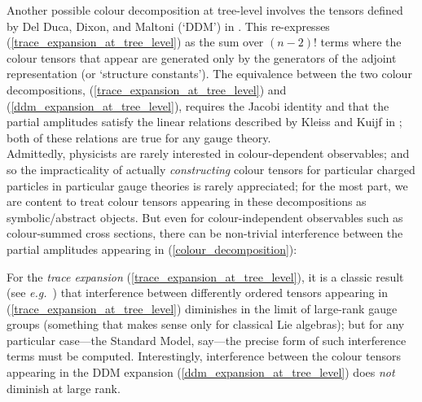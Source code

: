 \documentclass[12pt,a4paper]{article}\let\ifpdf\relax
\begin{document}
Another possible colour decomposition at tree-level involves the tensors defined by Del Duca, Dixon, and Maltoni (`DDM') in \cite{DelDuca:1999rs}. This re-expresses (\ref{trace_expansion_at_tree_level}) as the sum over $(n{-}2)!$ terms
%
\vspace{-0pt}
%
where the colour tensors that appear are generated only by the generators of the adjoint representation (or `structure constants'). The equivalence between the two colour decompositions, (\ref{trace_expansion_at_tree_level}) and (\ref{ddm_expansion_at_tree_level}), requires the Jacobi identity and that the partial amplitudes satisfy the linear relations described by Kleiss and Kuijf in \cite{KK}; both of these relations are true for any gauge theory.\\[-5pt]

Admittedly, physicists are rarely interested in colour-dependent observables; and so the impracticality of actually \emph{constructing} colour tensors for particular charged particles in particular gauge theories is rarely appreciated; for the most part, we are content to treat colour tensors appearing in these decompositions as symbolic/abstract objects. But even for colour-independent observables such as colour-summed cross sections, there can be non-trivial interference between the partial amplitudes appearing in (\ref{colour_decomposition}): 
%
%

For the \emph{trace expansion} (\ref{trace_expansion_at_tree_level}), it is a classic result (see \emph{e.g.}~\cite{Mangano:1988kk,Mangano:1990by}) that interference between differently ordered tensors appearing in (\ref{trace_expansion_at_tree_level}) diminishes in the limit of large-rank gauge groups (something that makes sense only for classical Lie algebras); but for any particular case---the Standard Model, say---the precise form of such interference terms must be computed. Interestingly, interference between the colour tensors appearing in the DDM expansion (\ref{ddm_expansion_at_tree_level}) does \emph{not} diminish at large rank.
\end{document}

